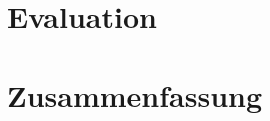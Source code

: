 \documentclass[a4paper, 11pt, twocolumn]{article}
\begin{document}



\section{Evaluation} %
\label{sec:evaluation}


\section{Zusammenfassung} %
\label{sec:zusammenfassung}




\end{document}
